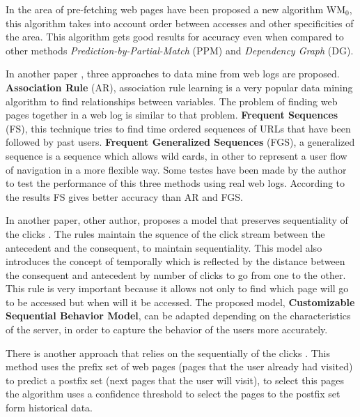 In the area of pre-fetching web pages \cite{Nanopoulos01effectiveprediction} have
been proposed a new algorithm WM\begin{math}_0\end{math}, this algorithm takes into
account order between accesses and other specificities of the area. This
algorithm gets good results for accuracy even when compared to other methods
\emph{Prediction-by-Partial-Match} (PPM) and \emph{Dependency Graph} (DG).

In another paper \cite{Gery:2003:EWU:956699.956716}, three approaches to
data mine from web logs are proposed. \textbf{Association Rule} (AR), association rule
learning is a very popular data mining algorithm to find relationships between
variables. The problem of finding web pages together in a web log is similar to
that problem. \textbf{Frequent Sequences} (FS), this technique tries to find time
ordered sequences of URLs that have been followed by past users.
\textbf{Frequent Generalized Sequences} (FGS), a generalized sequence is a
sequence which allows wild cards, in other to represent a user flow of
navigation in a more flexible way. 
Some testes have been made by the author \cite{Gery:2003:EWU:956699.956716} to
test the performance of this three methods using real web logs. According to the
results FS gives better accuracy than AR and FGS.

In another paper, other author, proposes a model that preserves sequentiality of
the clicks \cite{Frias-Martinez2003}. The rules maintain the squence of the
click stream between the antecedent and the consequent, to maintain sequentiality.
This model also introduces the concept of temporally which is reflected by the
distance between the consequent and antecedent by number of clicks to go from one
to the other. This rule is very important because it allows not only to find
which page will go to be accessed but when will it be accessed. The proposed
model, \textbf{Customizable Sequential Behavior Model}, can be adapted depending
on the characteristics of the server, in order to capture the behavior of the
users more accurately.

There is another approach that relies on the sequentially of the clicks
\cite{Jan:2007:WUB:1353862.1353874}.
This method uses the prefix set of web pages (pages that the user already had
visited) to predict a postfix set (next pages that the user will visit), to
select this pages the algorithm uses a confidence threshold to select the pages
to the postfix set form historical data.

